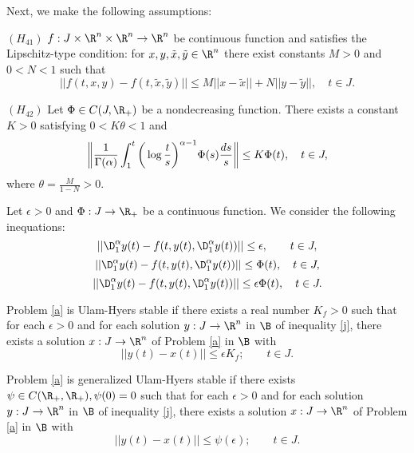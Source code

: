 Next, we make the following assumptions:
\begin{description}
\item $(H_{41})$ $f:J\times{\R}^{n}\times{\R}^{n}\to{\R}^{n}$ be continuous function and satisfies the Lipschitz-type condition: for $x,y,\tilde{x},\tilde{y}\in{\R}^{n}$ there exist constants $M>0$ and $0<N<1$ such that
  \begin{equation*}
  ||f(t,x,y)-f(t,\tilde{x},\tilde{y})||\leq M||x-\tilde{x}||+N||y-\tilde{y}||,\quad t\in{J}.
  \end{equation*}
\item $(H_{42})$ Let $\Phi\in C({J},{\R}_+)$ be a nondecreasing function. There exists a constant $K>0$ satisfying $0<K\theta<1$ and
      \begin{equation*}
      \bigg{\|}\frac{1}{\Gamma(\alpha)}\int_{1}^{t}\bigg(\log{\frac{t}{s}}\bigg)^{\alpha-1}\Phi(s)\frac{ds}{s}\bigg{\|}\leq K\Phi(t),\quad t\in{J},
      \end{equation*}
      where $\theta=\frac{M}{1-N}>0.$
\end{description}
Let $\epsilon>0$ and $\Phi:{J}\to{\R}_{+}$ be a continuous function. We consider the following inequations:
\begin{equation}\label{j}
||\D_{1}^{\alpha}y(t)-f(t,y(t),{\D_{1}^{\alpha}y(t)})||\leq\epsilon,\qquad t\in{J},
\end{equation}
\begin{equation}\label{k}
||\D_{1}^{\alpha}y(t)-f(t,y(t),{\D_{1}^{\alpha}y(t)})||\leq\Phi(t),\quad t\in{J},
\end{equation}
\begin{equation}\label{l}
||\D_{1}^{\alpha}y(t)-f(t,y(t),{\D_{1}^{\alpha}y(t)})||\leq\epsilon\Phi(t),\quad t\in{J}.
\end{equation}
\begin{defn}
Problem \eqref{a} is Ulam-Hyers stable if there exists a real number $K_f>0$ such that for each $\epsilon>0$ and for each solution $y:{J}\to{\R}^{n}$ in $\B$ of inequality \eqref{j}, there exists a solution $x:{J}\to{\R}^{n}$ of Problem \eqref{a} in $\B$ with
\begin{equation*}
||y(t)-x(t)||\leq\epsilon K_f;\qquad t\in{J}.
\end{equation*}
\end{defn}
\begin{defn}
Problem \eqref{a} is generalized Ulam-Hyers stable if there exists $\psi\in C({\R}_{+},{\R}_{+}), \psi(0)=0$ such that for each $\epsilon>0$ and for each solution $y:{J}\to{\R}^{n}$ in $\B$ of inequality \eqref{j}, there exists a solution $x:{J}\to{\R}^{n}$ of Problem \eqref{a} in $\B$ with
\begin{equation*}
||y(t)-x(t)||\leq \psi(\epsilon);\qquad t\in{J}.
\end{equation*}
\end{defn}
